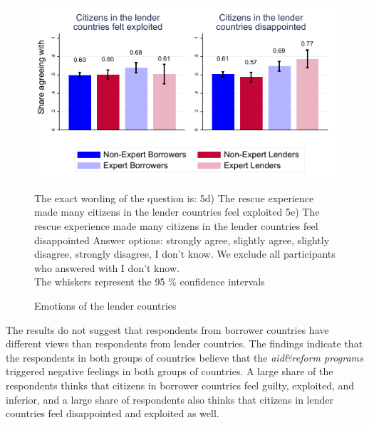 \begin{figure}[h!]
  \begin{center}
       \caption{Emotions of the lender countries}
    \includegraphics[scale=1.2]{graph5_2.pdf}
 
    \label{fig:figure4}
    \end{center}
    \tiny
    \begin{tablenotes}
     {The exact wording of the question is: 5d) The rescue experience made many citizens in the lender countries feel exploited 5e) The rescue experience made many citizens in the lender countries feel disappointed
    Answer options: strongly agree, slightly agree, slightly disagree, strongly disagree, I don't know. We exclude all participants who answered with I don't know. \\
    The whiskers represent the 95 \% confidence intervals}
    \end{tablenotes}
\end{figure}

The results do not suggest that respondents from borrower countries have different views than respondents from lender countries. The findings indicate that the respondents
in both groups of countries believe that the \textit{aid\&reform programs} triggered
negative feelings in both groups of countries. A large share of the respondents
thinks that citizens in borrower countries feel guilty, exploited, and
inferior, and a large share of respondents also thinks that citizens in
lender countries feel disappointed and exploited as well. 

